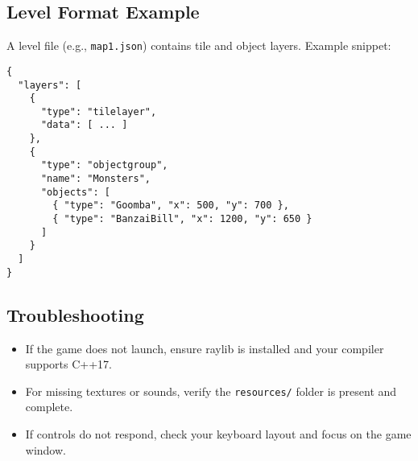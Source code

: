 \subsection{Level Format Example}
A level file (e.g., \texttt{map1.json}) contains tile and object layers. Example snippet:
\begin{verbatim}
{
  "layers": [
    {
      "type": "tilelayer",
      "data": [ ... ]
    },
    {
      "type": "objectgroup",
      "name": "Monsters",
      "objects": [
        { "type": "Goomba", "x": 500, "y": 700 },
        { "type": "BanzaiBill", "x": 1200, "y": 650 }
      ]
    }
  ]
}
\end{verbatim}

\subsection{Troubleshooting}
\begin{itemize}
    \item If the game does not launch, ensure raylib is installed and your compiler supports C++17.
    \item For missing textures or sounds, verify the \texttt{resources/} folder is present and complete.
    \item If controls do not respond, check your keyboard layout and focus on the game window.
\end{itemize}